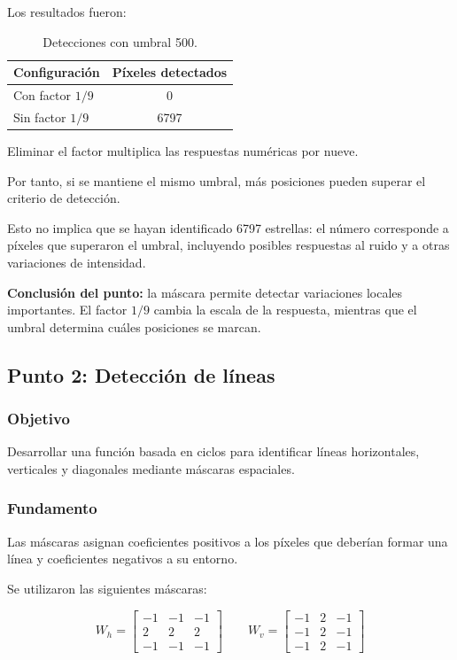 \documentclass[11pt,letterpaper]{article}
\begin{document}
Los resultados fueron:

\begin{table}[H]
\centering
\caption{Detecciones con umbral 500.}
\begin{tabular}{lc}
\toprule
\textbf{Configuración} &
\textbf{Píxeles detectados}\\
\midrule
Con factor $1/9$ & 0\\
Sin factor $1/9$ & 6797\\
\bottomrule
\end{tabular}
\end{table}

Eliminar el factor multiplica las respuestas
numéricas por nueve.

Por tanto, si se mantiene el mismo umbral,
más posiciones pueden superar el criterio
de detección.

Esto no implica que se hayan identificado
6797 estrellas: el número corresponde
a píxeles que superaron el umbral,
incluyendo posibles respuestas al ruido
y a otras variaciones de intensidad.

\textbf{Conclusión del punto:}
la máscara permite detectar variaciones
locales importantes. El factor $1/9$
cambia la escala de la respuesta,
mientras que el umbral determina
cuáles posiciones se marcan.

\subsection{Punto 2: Detección de líneas}

\subsubsection*{Objetivo}

Desarrollar una función basada en ciclos
para identificar líneas horizontales,
verticales y diagonales mediante
máscaras espaciales.

\subsubsection*{Fundamento}

Las máscaras asignan coeficientes positivos
a los píxeles que deberían formar una línea
y coeficientes negativos a su entorno.

Se utilizaron las siguientes máscaras:

\[
W_h=
\begin{bmatrix}
-1&-1&-1\\
2&2&2\\
-1&-1&-1
\end{bmatrix}
\qquad
W_v=
\begin{bmatrix}
-1&2&-1\\
-1&2&-1\\
-1&2&-1
\end{bmatrix}
\]
\end{document}
